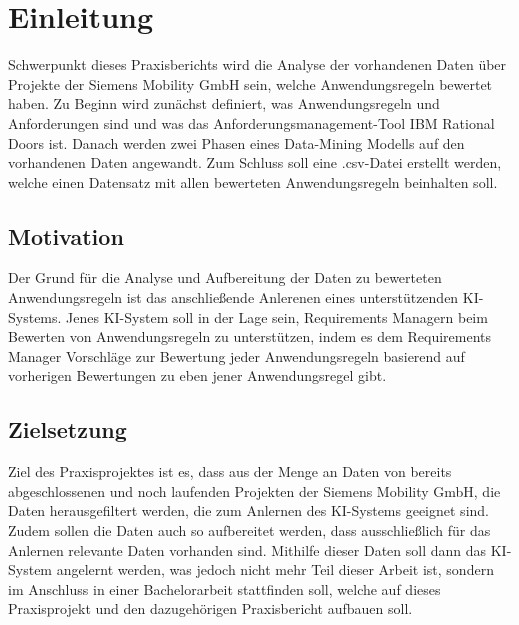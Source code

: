 \chapter{Einleitung}
\label{chap:einleitung}

Schwerpunkt dieses Praxisberichts wird die Analyse der vorhandenen Daten über Projekte der Siemens Mobility GmbH sein, welche Anwendungsregeln bewertet haben. Zu Beginn wird zunächst definiert, was
Anwendungsregeln und Anforderungen sind und was das Anforderungsmanagement-Tool IBM Rational Doors ist. Danach werden zwei Phasen eines Data-Mining Modells auf den vorhandenen Daten angewandt. Zum Schluss
soll eine .csv-Datei erstellt werden, welche einen Datensatz mit allen bewerteten Anwendungsregeln beinhalten soll. 

\section{Motivation}
Der Grund für die Analyse und Aufbereitung der Daten zu bewerteten Anwendungsregeln ist das anschließende Anlerenen eines unterstützenden KI-Systems. Jenes KI-System soll in der Lage sein,
Requirements Managern beim Bewerten von Anwendungsregeln zu unterstützen, indem es dem Requirements Manager Vorschläge zur Bewertung jeder Anwendungsregeln basierend auf vorherigen Bewertungen zu
eben jener Anwendungsregel gibt.

\section{Zielsetzung}
\label{chap:Zielsetzung}
Ziel des Praxisprojektes ist es, dass aus der Menge an Daten von bereits abgeschlossenen und noch laufenden Projekten der Siemens Mobility GmbH, die Daten herausgefiltert werden, die 
zum Anlernen des KI-Systems geeignet sind. Zudem sollen die Daten auch so aufbereitet werden, dass ausschließlich für das Anlernen relevante Daten vorhanden sind. Mithilfe dieser Daten
soll dann das KI-System angelernt werden, was jedoch nicht mehr Teil dieser Arbeit ist, sondern im Anschluss in einer Bachelorarbeit stattfinden soll, welche auf dieses Praxisprojekt und den 
dazugehörigen Praxisbericht aufbauen soll.

